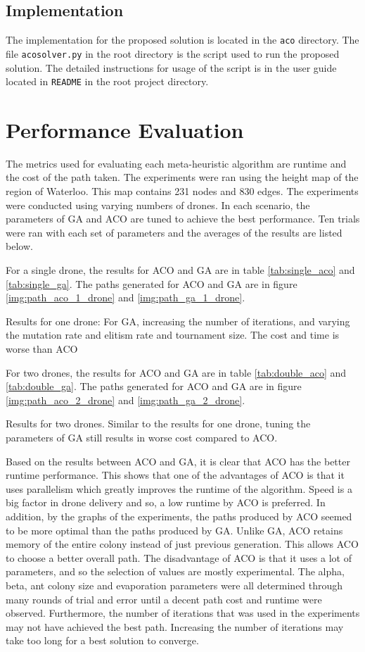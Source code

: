 \documentclass[conference]{IEEEtran}
\begin{document}
\subsection{Implementation}
The implementation for the proposed solution is located in the \verb|aco| directory. The file \verb|acosolver.py| in the root directory is the script used to run the proposed solution. The detailed instructions for usage of the script is in the user guide located in \verb|README| in the root project directory. 

\section{Performance Evaluation}
The metrics used for evaluating each meta-heuristic algorithm are runtime and the cost of the path taken. The experiments were ran using the height map of the region of Waterloo. This map contains 231 nodes and 830 edges. The experiments were conducted using varying numbers of drones. In each scenario, the parameters of GA and ACO are tuned to achieve the best performance. Ten trials were ran with each set of parameters and the averages of the results are listed below.

For a single drone, the results for ACO and GA are in table \ref{tab:single_aco} and \ref{tab:single_ga}. The paths generated for ACO and GA are in figure \ref{img:path_aco_1_drone} and \ref{img:path_ga_1_drone}.

Results for one drone: For GA, increasing the number of iterations, and varying the mutation rate and elitism rate and tournament size. The cost and time is worse than ACO

For two drones, the results for ACO and GA are in table \ref{tab:double_aco} and \ref{tab:double_ga}. The paths generated for ACO and GA are in figure \ref{img:path_aco_2_drone} and \ref{img:path_ga_2_drone}.

Results for two drones. Similar to the results for one drone, tuning the parameters of GA still results in worse cost compared to ACO. 

Based on the results between ACO and GA, it is clear that ACO has the better runtime performance. This shows that one of the advantages of ACO is that it uses parallelism which greatly improves the runtime of the algorithm. Speed is a big factor in drone delivery and so, a low runtime by ACO is preferred. In addition, by the graphs of the experiments, the paths produced by ACO seemed to be more optimal than the paths produced by GA. Unlike GA, ACO retains memory of the entire colony instead of just previous generation. This allows ACO to choose a better overall path. The disadvantage of ACO is that it uses a lot of parameters, and so the selection of values are mostly experimental. The alpha, beta, ant colony size and evaporation parameters were all determined through many rounds of trial and error until a decent path cost and runtime were observed. Furthermore, the number of iterations that was used in the experiments may not have achieved the best path. Increasing the number of iterations may take too long for a best solution to converge.
\end{document}
